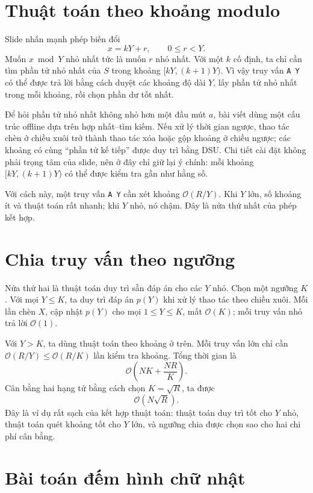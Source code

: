 \documentclass[11pt]{article}
\newcommand{\Oh}{\mathcal{O}}
\begin{document}
\section{Thuật toán theo khoảng modulo}

Slide nhấn mạnh phép biến đổi
\[
  x=kY+r,\qquad 0\le r<Y.
\]
Muốn \(x\bmod Y\) nhỏ nhất tức là muốn \(r\) nhỏ nhất. Với một \(k\) cố định,
ta chỉ cần tìm phần tử nhỏ nhất của \(S\) trong khoảng \([kY,(k+1)Y)\). Vì
vậy truy vấn \texttt{A Y} có thể được trả lời bằng cách duyệt các khoảng độ
dài \(Y\), lấy phần tử nhỏ nhất trong mỗi khoảng, rồi chọn phần dư tốt nhất.

Để hỏi phần tử nhỏ nhất không nhỏ hơn một đầu mút \(a\), bài viết dùng một
cấu trúc offline dựa trên hợp nhất--tìm kiếm. Nếu xử lý thời gian ngược, thao
tác chèn ở chiều xuôi trở thành thao tác xóa hoặc gộp khoảng ở chiều ngược;
các khoảng có cùng ``phần tử kế tiếp'' được duy trì bằng DSU. Chi tiết cài
đặt không phải trọng tâm của slide, nên ở đây chỉ giữ lại ý chính: mỗi khoảng
\([kY,(k+1)Y)\) có thể được kiểm tra gần như hằng số.

Với cách này, một truy vấn \texttt{A Y} cần xét khoảng \(\Oh(R/Y)\). Khi
\(Y\) lớn, số khoảng ít và thuật toán rất nhanh; khi \(Y\) nhỏ, nó chậm. Đây
là nửa thứ nhất của phép kết hợp.

\section{Chia truy vấn theo ngưỡng}

Nửa thứ hai là thuật toán duy trì sẵn đáp án cho các \(Y\) nhỏ. Chọn một
ngưỡng \(K\). Với mọi \(Y\le K\), ta duy trì đáp án \(p(Y)\) khi xử lý thao
tác theo chiều xuôi. Mỗi lần chèn \(X\), cập nhật \(p(Y)\) cho mọi
\(1\le Y\le K\), mất \(\Oh(K)\); mỗi truy vấn nhỏ trả lời \(\Oh(1)\).

Với \(Y>K\), ta dùng thuật toán theo khoảng ở trên. Mỗi truy vấn lớn chỉ cần
\(\Oh(R/Y)\le \Oh(R/K)\) lần kiểm tra khoảng. Tổng thời gian là
\[
  \Oh\left(NK+\frac{NR}{K}\right).
\]
Cân bằng hai hạng tử bằng cách chọn \(K=\sqrt{R}\), ta được
\[
  \Oh(N\sqrt{R}).
\]
Đây là ví dụ rất sạch của kết hợp thuật toán: thuật toán duy trì tốt cho
\(Y\) nhỏ, thuật toán quét khoảng tốt cho \(Y\) lớn, và ngưỡng chia được chọn
sao cho hai chi phí cân bằng.

\section{Bài toán đếm hình chữ nhật}
\end{document}
